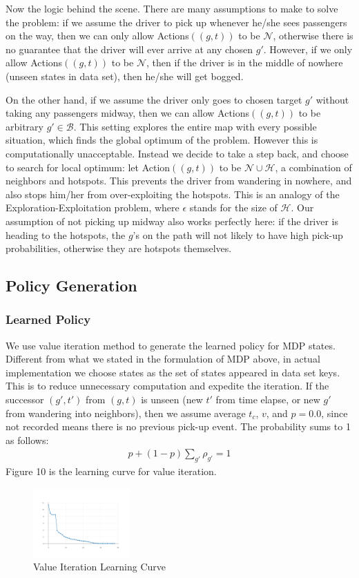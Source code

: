 \documentclass[letterpaper, 10 pt, conference]{ieeeconf}
\begin{document}
Now the logic behind the scene. There are many assumptions to make to solve the problem: if we assume the driver to pick up whenever he/she sees passengers on the way, then we can only allow Actions$((g,t))$ to be $\mathcal{N}$, otherwise there is no guarantee that the driver will ever arrive at any chosen $g'$. However, if we only allow Actions$((g,t))$ to be $\mathcal{N}$, then if the driver is in the middle of nowhere (unseen states in data set), then he/she will get bogged. 

On the other hand, if we assume the driver only goes to chosen target $g'$ without taking any passengers midway, then we can allow Actions$((g,t))$ to be arbitrary $g'\in\mathcal{B}$. This setting explores the entire map with every possible situation, which finds the global optimum of the problem. However this is computationally unacceptable. Instead we decide to take a step back, and choose to search for local optimum: let Action$((g,t))$ to be $\mathcal{N}\cup\mathcal{H}$, a combination of neighbors and hotspots. This prevents the driver from wandering in nowhere, and also stops him/her from over-exploiting the hotspots. This is an analogy of the Exploration-Exploitation problem, where $\epsilon$ stands for the size of $\mathcal{H}$. Our assumption of not picking up midway also works perfectly here: if the driver is heading to the hotspots, the $g$'s on the path will not likely to have high pick-up probabilities, otherwise they are hotspots themselves.
\subsection{Policy Generation}
\subsubsection{Learned Policy}
We use value iteration method to generate the learned policy for MDP states. Different from what we stated in the formulation of MDP above, in actual implementation we choose states as the set of states appeared in data set keys. This is to reduce unnecessary computation and expedite the iteration. If the successor $(g',t')$ from $(g,t)$ is unseen (new $t'$ from time elapse, or new $g'$ from wandering into neighbors), then we assume average $t_c$, $v$, and $p=0.0$, since not recorded means there is no previous pick-up event. The probability sums to 1 as follows:
\begin{align}
p + (1-p)\sum_{g'}\rho_{g'} =1
\end{align}
Figure 10 is the learning curve for value iteration.
\begin{figure}
\centering
\includegraphics[width=0.33\textwidth]{tiny_VI_curve.png}
\caption{Value Iteration Learning Curve}
\end{figure}
\end{document}
